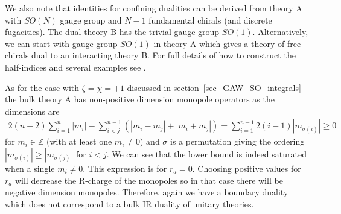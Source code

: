 \documentclass[12pt]{article}
\newcommand{\Zb}{\mathbb{Z}}
\numberwithin{equation}{section}
\begin{document}
We also note that identities for confining dualities can be derived from theory A with $SO(N)$ gauge group and $N-1$ fundamental chirals (and discrete fugacities). The dual theory B has the trivial gauge group $SO(1)$. Alternatively, we can start with gauge group $SO(1)$ in theory A which gives a theory of free chirals dual to an interacting theory B. For full details of how to construct the half-indices and several examples see \cite{Okazaki:2021pnc}.

As for the case with $\zeta = \chi = +1$ discussed in section~\ref{sec_GAW_SO_integrals} the bulk theory A has non-positive dimension monopole operators as the dimensions are
\begin{align}
\label{Mono_Ch_soN_Nm2_disc}
    2(n-2) \sum_{i = 1}^n |m_i| - \sum_{i < j}^{n-1} \left( |m_i - m_j| + |m_i + m_j| \right)
    = \sum_{i=1}^{n-1} 2(i-1)|m_{\sigma(i)}| \ge 0
\end{align}
for $m_i \in \Zb$ (with at least one $m_i \ne 0$) and $\sigma$ is a permutation giving the ordering $|m_{\sigma(i)}| \ge |m_{\sigma(j)}|$ for $i < j$. We can see that the lower bound is indeed saturated when a single $m_i \ne 0$. This expression is for $r_a = 0$. Choosing positive values for $r_a$ will decrease the R-charge of the monopoles so in that case there will be negative dimension monopoles.
Therefore, again we have a boundary duality which does not correspond to a bulk IR duality of unitary theories. 

\end{document}
